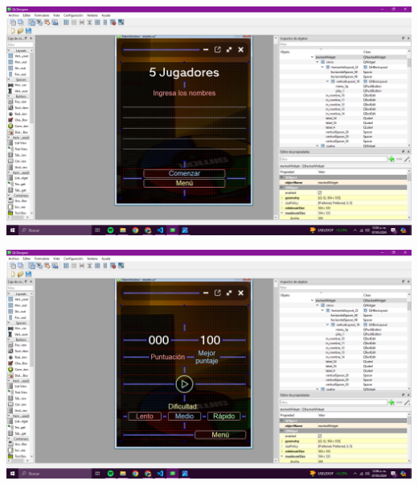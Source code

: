 \documentclass{article}
\begin{document}
\newpage


\vspace{0.2cm}
\includegraphics[width=0.8\linewidth]{Captura de pantalla (761).png}

\vspace{0.2cm}


\includegraphics[width=0.8\linewidth]{Captura de pantalla (762).png}

\vspace{0.2cm}
\end{document}
